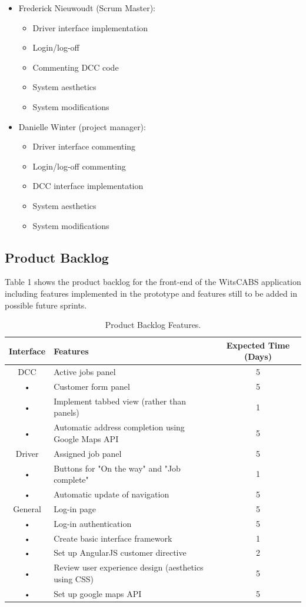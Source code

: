 \documentclass[12pt]{article}
\begin{document}
\begin{itemize}
\item Frederick Nieuwoudt (Scrum Master):
\begin{itemize}
\item Driver interface implementation
\item Login/log-off
\item Commenting DCC code
\item System aesthetics
\item System modifications
\end{itemize}
\item Danielle Winter (project manager):
\begin{itemize}
\item Driver interface commenting
\item Login/log-off commenting
\item DCC interface implementation
\item System aesthetics
\item System modifications
\end{itemize}
\end{itemize}

\subsection{Product Backlog}
Table 1 shows the product backlog for the front-end of the WitsCABS application including features implemented in the prototype and features still to be added in possible future sprints.\\
\begin{table}[htb]
    \caption{Product Backlog Features.\label{tab:fonts}}
    \begin{center}
\begin{tabular}{|c|l|c|}
\hline 
Interface & Features & Expected Time (Days)\\ 
\hline 
DCC & Active jobs panel & 5\\ 
• & Customer form panel & 5\\ 
• & Implement tabbed view (rather than panels) & 1 \\
• & Automatic address completion using Google Maps API & 5\\

\hline 
Driver & Assigned job panel & 5\\
• & Buttons for "On the way" and "Job complete" & 1\\ 
• & Automatic update of navigation & 5\\
\hline 
General & Log-in page & 5\\ 
• & Log-in authentication & 5\\
• & Create basic interface framework & 1\\
• & Set up AngularJS customer directive & 2\\
• & Review user experience design (aesthetics using CSS) & 5\\
• & Set up google maps API & 5\\
\hline
\end{tabular}
\end{center}
\end{table}
\end{document}
